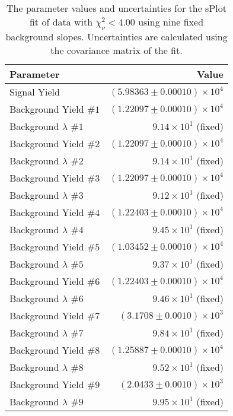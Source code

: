 
\begin{table}[ht]
    \begin{center}
        \begin{tabular}{lr}\toprule
            Parameter & Value \\\midrule
            Signal Yield & $(5.98363 \pm 0.00010) \times 10^{4}$ \\
            Background Yield $\#1$ & $(1.22097 \pm 0.00010) \times 10^{4}$ \\
            Background $\lambda$ $\#1$ & $9.14 \times 10^{1}$ (fixed) \\
            Background Yield $\#2$ & $(1.22097 \pm 0.00010) \times 10^{4}$ \\
            Background $\lambda$ $\#2$ & $9.14 \times 10^{1}$ (fixed) \\
            Background Yield $\#3$ & $(1.22097 \pm 0.00010) \times 10^{4}$ \\
            Background $\lambda$ $\#3$ & $9.12 \times 10^{1}$ (fixed) \\
            Background Yield $\#4$ & $(1.22403 \pm 0.00010) \times 10^{4}$ \\
            Background $\lambda$ $\#4$ & $9.45 \times 10^{1}$ (fixed) \\
            Background Yield $\#5$ & $(1.03452 \pm 0.00010) \times 10^{4}$ \\
            Background $\lambda$ $\#5$ & $9.37 \times 10^{1}$ (fixed) \\
            Background Yield $\#6$ & $(1.22403 \pm 0.00010) \times 10^{4}$ \\
            Background $\lambda$ $\#6$ & $9.46 \times 10^{1}$ (fixed) \\
            Background Yield $\#7$ & $(3.1708 \pm 0.0010) \times 10^{3}$ \\
            Background $\lambda$ $\#7$ & $9.84 \times 10^{1}$ (fixed) \\
            Background Yield $\#8$ & $(1.25887 \pm 0.00010) \times 10^{4}$ \\
            Background $\lambda$ $\#8$ & $9.52 \times 10^{1}$ (fixed) \\
            Background Yield $\#9$ & $(2.0433 \pm 0.0010) \times 10^{3}$ \\
            Background $\lambda$ $\#9$ & $9.95 \times 10^{1}$ (fixed) \\\bottomrule
        \end{tabular}
        \caption{The parameter values and uncertainties for the sPlot fit of data with $\chi^2_\nu < 4.00$ using nine fixed background slopes. Uncertainties are calculated using the covariance matrix of the fit.}\label{tab:splot-fit-results-chisqdof-4.00-fixed-9}
    \end{center}
\end{table}

